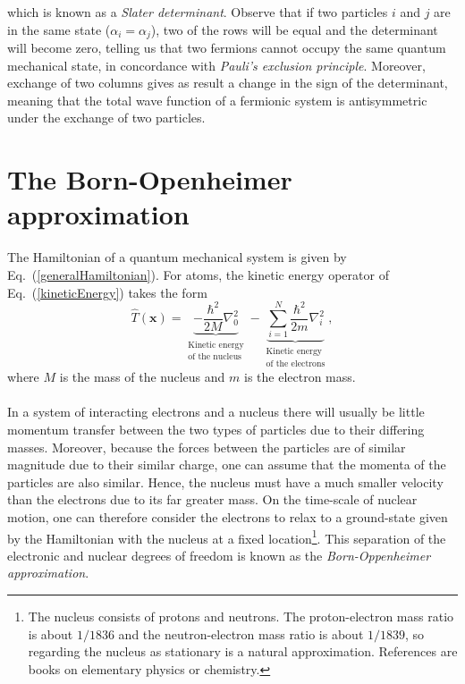 which is known as a \emph{Slater determinant}. 
Observe that if two particles $i$ and $j$ are in the same state ($\alpha_i = \alpha_j$), two of the rows will be equal and the determinant will become zero, telling us that two fermions cannot occupy the same quantum mechanical state, in concordance with \emph{Pauli's exclusion principle}. Moreover, exchange of two columns gives as result a change in the sign of the determinant, meaning that the total wave function of a fermionic system is antisymmetric under the exchange of two particles. 

\section{The Born-Openheimer approximation}
The Hamiltonian of a quantum mechanical system is given by Eq.~(\ref{generalHamiltonian}). For atoms, the kinetic energy operator of Eq.~(\ref{kineticEnergy}) takes the form 
$$
  \hat{T}(\mathbf{x}) = \underbrace{-\frac{\hbar^2}{2M}\nabla^{2}_{0}}_{\begin{smallmatrix} \text{Kinetic energy} \\ \text{of the nucleus} \end{smallmatrix}}
  -\underbrace{\sum_{i=1}^{N}\frac{\hbar^2}{2m}\nabla^{2}_{i}}_{\begin{smallmatrix}\text{Kinetic energy} \\ \text{of the electrons} \end{smallmatrix}},
$$
where $M$ is the mass of the nucleus and $m$ is the electron mass.\\
\\
In a system of interacting electrons and a nucleus there will usually be little momentum transfer between the two types of particles due to their differing masses. Moreover, because the forces between the particles are of similar magnitude due to their similar charge, one can assume that the momenta of the particles are also similar. Hence, the nucleus must have a much smaller velocity than the electrons due to its far greater mass. On the time-scale of nuclear motion, one can therefore consider the electrons to relax to a ground-state given by the Hamiltonian with the nucleus at a fixed location\footnote{The nucleus consists of protons and neutrons. The proton-electron mass ratio is about $1/1836$ and the neutron-electron mass ratio is about $1 / 1839$, so regarding the nucleus as stationary is a natural
approximation. References are books on elementary physics or chemistry.}. This separation of the electronic and nuclear degrees of freedom is known as the \emph{Born-Oppenheimer approximation}\cite{jensen,Reine}.\\
